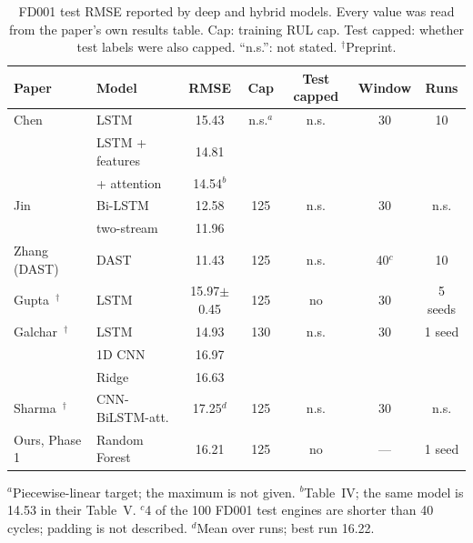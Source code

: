 \begin{table}[t]
\centering
\caption{FD001 test RMSE reported by deep and hybrid models. Every value was
read from the paper's own results table. Cap: training RUL cap. Test capped:
whether test labels were also capped. ``n.s.'': not stated. $^\dagger$Preprint.}
\label{tab:lit_dl}
\footnotesize
\setlength{\tabcolsep}{2.5pt}
\begin{tabular}{llccccc}
\hline
Paper & Model & RMSE & Cap & Test capped & Window & Runs \\
\hline
Chen~\cite{Chen2021machine} & LSTM & 15.43 & n.s.$^a$ & n.s. & 30 & 10 \\
 & LSTM + features & 14.81 & & & & \\
 & + attention & 14.54$^b$ & & & & \\
Jin~\cite{Jin2022bilstm} & Bi-LSTM & 12.58 & 125 & n.s. & 30 & n.s. \\
 & two-stream & 11.96 & & & & \\
Zhang (DAST)~\cite{Zhang2022dual} & DAST & 11.43 & 125 & n.s. & 40$^c$ & 10 \\
Gupta~\cite{Gupta2026auditing}$^\dagger$ & LSTM & 15.97$\pm$0.45 & 125 & no & 30 & 5 seeds \\
Galchar~\cite{Galchar2026remaining}$^\dagger$ & LSTM & 14.93 & 130 & n.s. & 30 & 1 seed \\
 & 1D CNN & 16.97 & & & & \\
 & Ridge & 16.63 & & & & \\
Sharma~\cite{Sharma2025uncertainty}$^\dagger$ & CNN-BiLSTM-att. & 17.25$^d$ & 125 & n.s. & 30 & n.s. \\
\hline
Ours, Phase 1 & Random Forest & 16.21 & 125 & no & --- & 1 seed \\
\hline
\end{tabular}

\smallskip
\raggedright\scriptsize
$^a$Piecewise-linear target; the maximum is not given.
$^b$Table~IV; the same model is 14.53 in their Table~V.
$^c$4 of the 100 FD001 test engines are shorter than 40 cycles; padding is not described.
$^d$Mean over runs; best run 16.22.
\end{table}

